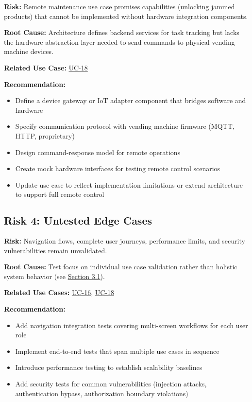 \documentclass[11pt,a4paper]{article}
\begin{document}
\textbf{Risk:} Remote maintenance use case promises capabilities (unlocking jammed products) that cannot be implemented without hardware integration components.

\textbf{Root Cause:} Architecture defines backend services for task tracking but lacks the hardware abstraction layer needed to send commands to physical vending machine devices.

\textbf{Related Use Case:} \hyperref[uc:remote-maintenance]{UC-18}

\textbf{Recommendation:}
\begin{itemize}
    \item Define a device gateway or IoT adapter component that bridges software and hardware
    \item Specify communication protocol with vending machine firmware (MQTT, HTTP, proprietary)
    \item Design command-response model for remote operations
    \item Create mock hardware interfaces for testing remote control scenarios
    \item Update use case to reflect implementation limitations or extend architecture to support full remote control
\end{itemize}

\subsection{Risk 4: Untested Edge Cases}
\label{risk:untested}

\textbf{Risk:} Navigation flows, complete user journeys, performance limits, and security vulnerabilities remain unvalidated.

\textbf{Root Cause:} Test focus on individual use case validation rather than holistic system behavior (see \hyperref[sec:uc-gaps]{Section 3.1}).

\textbf{Related Use Cases:} \hyperref[uc:navigation]{UC-16}, \hyperref[uc:remote-maintenance]{UC-18}

\textbf{Recommendation:}
\begin{itemize}
    \item Add navigation integration tests covering multi-screen workflows for each user role
    \item Implement end-to-end tests that span multiple use cases in sequence
    \item Introduce performance testing to establish scalability baselines
    \item Add security tests for common vulnerabilities (injection attacks, authentication bypass, authorization boundary violations)
\end{itemize}
\end{document}
